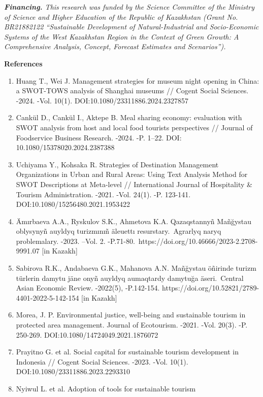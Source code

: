 \emph{{\bfseries Financing.} This research was funded by the Science
Committee of the Ministry of Science and Higher Education of the
Republic of Kazakhstan (Grant No. BR21882122 ``Sustainable Development
of Natural-Industrial and Socio-Economic Systems of the West Kazakhstan
Region in the Context of Green Growth: A Comprehensive Analysis,
Concept, Forecast Estimates and Scenarios'').}

{\bfseries References}

\begin{enumerate}
\def\labelenumi{\arabic{enumi}.}
\item
  Huang T., Wei J. Management strategies for museum night opening in
  China: a SWOT-TOWS analysis of Shanghai museums // Cogent Social
  Sciences. -2024. -Vol. 10(1). DOI:10.1080/23311886.2024.2327857
\item
  Cankül D., Cankül I., Aktepe B. Meal sharing economy: evaluation with
  SWOT analysis from host and local food tourists perspectives //
  Journal of Foodservice Business Research. -2024. -P. 1--22. DOI:
  10.1080/15378020.2024.2387388
\item
  Uchiyama Y., Kohsaka R. Strategies of Destination Management
  Organizations in Urban and Rural Areas: Using Text Analysis Method for
  SWOT Descriptions at Meta-level // International Journal of
  Hospitality \& Tourism Administration. -2021. -Vol. 24(1). -P.
  123-141. DOI:10.1080/15256480.2021.1953422
\item
  Ämırbaeva A.A., Ryskulov S.K., Ahmetova K.A. Qazaqstannyñ Mañğystau
  oblysynyñ auyldyq turizmınıñ äleuettı resurstary.~Agrarlyq naryq
  problemalary. -2023. --Vol. 2.
  -P.71-80.~https://doi.org/10.46666/2023-2.2708-9991.07 {[}in Kazakh{]}
\item
  Sabirova R.K., Andabaeva G.K., Mahanova A.N. Mañğystau öñirinde turizm
  türlerin damytu jäne onyñ auyldyq aumaqtardy damytuğa äseri.~Central
  Asian Economic Review. -2022(5), -P.142-154.
  https://doi.org/10.52821/2789-4401-2022-5-142-154 {[}in Kazakh{]}
\item
  Morea, J. P. Environmental justice, well-being and sustainable tourism
  in protected area management. Journal of Ecotourism. -2021. -Vol.
  20(3). -P. 250-269. DOI:10.1080/14724049.2021.1876072
\item
  Prayitno G. et al. Social capital for sustainable tourism development
  in Indonesia // Cogent Social Sciences. -2023. -Vol. 10(1).
  DOI:10.1080/23311886.2023.2293310
\item
  Nyiwul L. et al. Adoption of tools for sustainable tourism

\end{enumerate}
